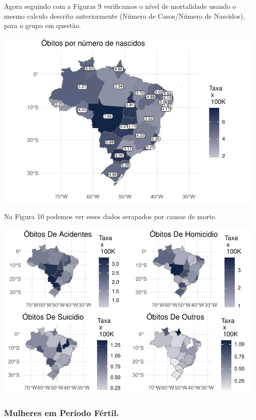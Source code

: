 \documentclass[
]{article}
\let\origfigure\figure
\let\endorigfigure\endfigure
\renewenvironment{figure}[1][2] {
    \expandafter\origfigure\expandafter[H]
} {
    \endorigfigure
}
\begin{document}
Agora seguindo com a Figuras 9 verificamos o nível de mortalidade usando
o mesmo calculo descrito anteriormente (Número de Casos/Número de
Nascidos), para o grupo em questão.

\begin{figure}
\centering
\includegraphics{RelatorioV02_files/figure-latex/unnamed-chunk-18-1.pdf}
\caption{Gestantes e Puérperas}
\end{figure}

Na Figura 10 podemos ver esses dados serapados por causas de morte.

\begin{figure}
\centering
\includegraphics{RelatorioV02_files/figure-latex/unnamed-chunk-19-1.pdf}
\caption{Gestantes e Puérperas separados por CID}
\end{figure}

\hypertarget{mulheres-em-peruxedodo-fuxe9rtil.-2}{%
\subsubsection{Mulheres em Período
Fértil.}\label{mulheres-em-peruxedodo-fuxe9rtil.-2}}
\end{document}

